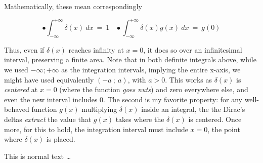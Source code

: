 \begin{svgraybox}
	Mathematically, these mean correspondingly 

	\begin{equation}
		\bullet \int_{ -\infty}^{ +\infty} \delta(x)\ dx\ =\ 1 \ \ \ \ \bullet \int_{ -\infty}^{ +\infty} \delta(x)g(x)\ dx\ =\ g(0) 
	\end{equation}
	
	Thus, even if \(\delta(x)\) reaches infinity at \(x= 0\), it does so over an infinitesimal interval, preserving a finite area. Note that in both definite integrals above, while we used \(-\infty ; +\infty \) as the integration intervals, implying the entire x-axis, we might have used equivalently \((-a\ ;\ a) \), with \(a> 0 \). This works as \(\delta(x)\) is \textit{centered} at \(x= 0\) (where the function \textit{goes nuts}) and zero everywhere else, and even the new interval includes \(0\).  
	The second is my favorite property: for any well-behaved function \(g(x)\) multiplying \(\delta(x)\) inside an integral, the the Dirac's deltas \textit{extract} the value that \(g(x)\) takes where the \(\delta(x)\) is centered. Once more, for this to hold, the integration interval must include \(x= 0\), the point where \(\delta(x)\) is placed. 
\end{svgraybox}


This is normal text \dots


